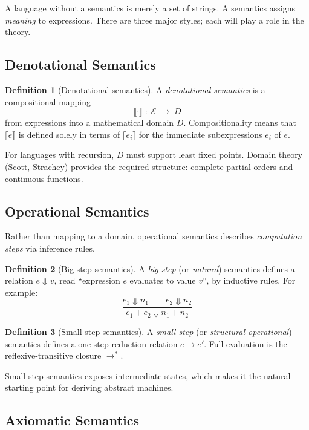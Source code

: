 \documentclass[11pt, a4paper]{article}
\theoremstyle{definition}
\newtheorem{definition}{Definition}[section]
\theoremstyle{plain}
\theoremstyle{remark}
\begin{document}
A language without a semantics is merely a set of strings. A semantics
assigns \emph{meaning} to expressions. There are three major styles; each
will play a role in the theory.

\subsection{Denotational Semantics}

\begin{definition}[Denotational semantics]
  A \emph{denotational semantics} is a compositional mapping
  \[
    \llbracket \cdot \rrbracket \;:\; \mathcal{E} \;\to\; D
  \]
  from expressions into a mathematical domain $D$. Compositionality means
  that $\llbracket e \rrbracket$ is defined solely in terms of
  $\llbracket e_i \rrbracket$ for the immediate subexpressions $e_i$ of $e$.
\end{definition}

For languages with recursion, $D$ must support least fixed points. Domain
theory (Scott, Strachey) provides the required structure: complete partial
orders and continuous functions.

\subsection{Operational Semantics}

Rather than mapping to a domain, operational semantics describes
\emph{computation steps} via inference rules.

\begin{definition}[Big-step semantics]
  A \emph{big-step} (or \emph{natural}) semantics defines a relation
  $e \Downarrow v$, read ``expression $e$ evaluates to value $v$'', by
  inductive rules. For example:
  \[
    \frac{e_1 \Downarrow n_1 \qquad e_2 \Downarrow n_2}
         {e_1 + e_2 \Downarrow n_1 + n_2}
  \]
\end{definition}

\begin{definition}[Small-step semantics]
  A \emph{small-step} (or \emph{structural operational}) semantics defines a
  one-step reduction relation $e \to e'$. Full evaluation is the
  reflexive-transitive closure $\to^{*}$.
\end{definition}

Small-step semantics exposes intermediate states, which makes it the natural
starting point for deriving abstract machines.

\subsection{Axiomatic Semantics}
\end{document}
